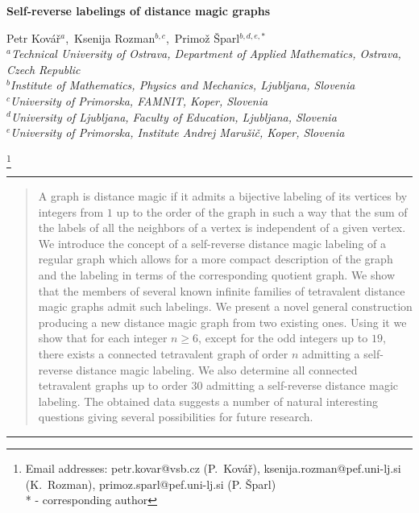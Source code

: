 \documentclass[11 pt,english]{article}
\newcommand\blfootnote[1]{%
  \begingroup
  \renewcommand\thefootnote{}\footnote{#1}%
  \addtocounter{footnote}{-1}%
  \endgroup
}
\theoremstyle{definition}
\begin{document}
\begin{center}
\Large{\textbf{Self-reverse labelings of distance magic graphs}} \\ [+4ex]
\end{center}

\begin{center}
Petr Kov\'a\v{r}{\small $^{a}$},\   
Ksenija Rozman{\small $^{b,c}$},\
Primo\v z \v Sparl{\small $^{b,d,e,*}$}
\\

\medskip
{\it {\small
$^a$Technical University of Ostrava, Department of Applied Mathematics, Ostrava, Czech Republic\\
$^b$Institute of Mathematics, Physics and Mechanics, Ljubljana, Slovenia\\
$^c$University of Primorska, FAMNIT, Koper, Slovenia\\
$^d$University of Ljubljana, Faculty of Education, Ljubljana, Slovenia\\
$^e$University of Primorska, Institute Andrej Maru\v si\v c, Koper, Slovenia\\
}}
\end{center}

\blfootnote{
Email addresses: 
petr.kovar@vsb.cz (P.~Kov\'a\v{r}), ksenija.rozman@pef.uni-lj.si (K.~Rozman), primoz.sparl@pef.uni-lj.si (P. \v Sparl)
\\
* - corresponding author
}





\hrule

\begin{abstract}
A graph is distance magic if it admits a bijective labeling of its vertices by integers from $1$ up to the order of the graph in such a way that the sum of the labels of all the neighbors of a vertex is independent of a given vertex. We introduce the concept of a self-reverse distance magic labeling of a regular graph which allows for a more compact description of the graph and the labeling in terms of the corresponding quotient graph. We show that the members of several known infinite families of tetravalent distance magic graphs admit such labelings. We present a novel general construction producing a new distance magic graph from two existing ones. Using it we show that for each integer $n \geq 6$, except for the odd integers up to $19$, there exists a connected tetravalent graph of order $n$ admitting a self-reverse distance magic labeling. We also determine all connected tetravalent graphs up to order $30$ admitting a self-reverse distance magic labeling. The obtained data suggests a number of natural interesting questions giving several possibilities for future research.
\end{abstract}
\hrule
\end{document}
